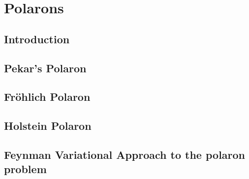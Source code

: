 
\chapter{Polarons} %

\label{Chapter3} %



\section{Introduction}

\section{Pekar's Polaron}

\section{Fr{\"o}hlich Polaron}

\section{Holstein Polaron}

\section{Feynman Variational Approach to the polaron problem}

